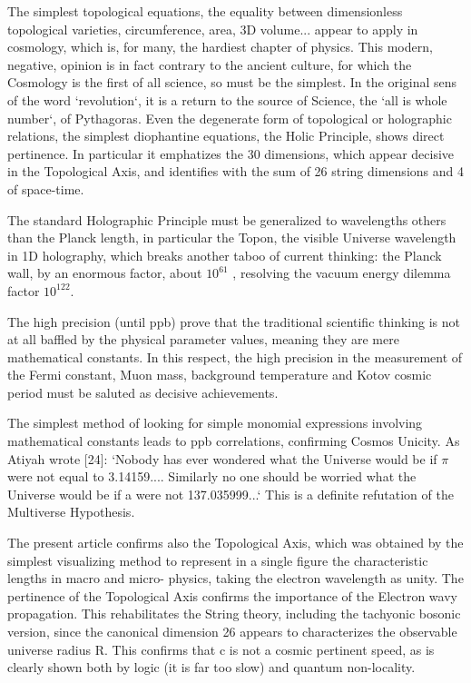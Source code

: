 \documentclass[twoside,draft]{article}
\begin{document}
\begin{sloppypar}
{The simplest topological equations, the equality between dimensionless topological varieties,
circumference, area, 3D volume... appear to apply in cosmology, which is, for many, the hardiest
chapter of physics. This modern, negative, opinion is in fact contrary to the ancient culture, for
which the Cosmology is the first of all science, so must be the simplest. In the original sens of the
word `revolution`, it is a return to the source of Science, the `all is whole number`, of Pythagoras.
Even the degenerate form of topological or holographic relations, the simplest diophantine
equations, the Holic Principle, shows direct pertinence. In particular it emphatizes the 30
dimensions, which appear decisive in the Topological Axis, and identifies with the sum of 26 string
dimensions and 4 of space-time.

The standard Holographic Principle must be generalized to wavelengths others than the Planck
length, in particular the Topon, the visible Universe wavelength in 1D holography, which breaks
another taboo of current thinking: the Planck wall, by an enormous factor, about $10^{61}$ , resolving the
vacuum energy dilemma factor $10^{122}$.

The high precision (until ppb) prove that the traditional scientific thinking is not at all baffled by
the physical parameter values, meaning they are mere mathematical constants. In this respect, the
high precision in the measurement of the Fermi constant, Muon mass, background temperature and
Kotov cosmic period must be saluted as decisive achievements.

The simplest method of looking for simple monomial expressions involving mathematical
constants leads to ppb correlations, confirming Cosmos Unicity. As Atiyah wrote [24]: `Nobody has
ever wondered what the Universe would be if $\pi$ were not equal to 3.14159.... Similarly no one
should be worried what the Universe would be if a were not 137.035999...` This is a definite
refutation of the Multiverse Hypothesis.

The present article confirms also the Topological Axis, which was obtained by the simplest
visualizing method to represent in a single figure the characteristic lengths in macro and micro-
physics, taking the electron wavelength as unity. The pertinence of the Topological Axis confirms
the importance of the Electron wavy propagation. This rehabilitates the String theory, including the
tachyonic bosonic version, since the canonical dimension 26 appears to characterizes the observable
universe radius R. This confirms that c is not a cosmic pertinent speed, as is clearly shown both by
logic (it is far too slow) and quantum non-locality.

}
\end{sloppypar}
\end{document}
